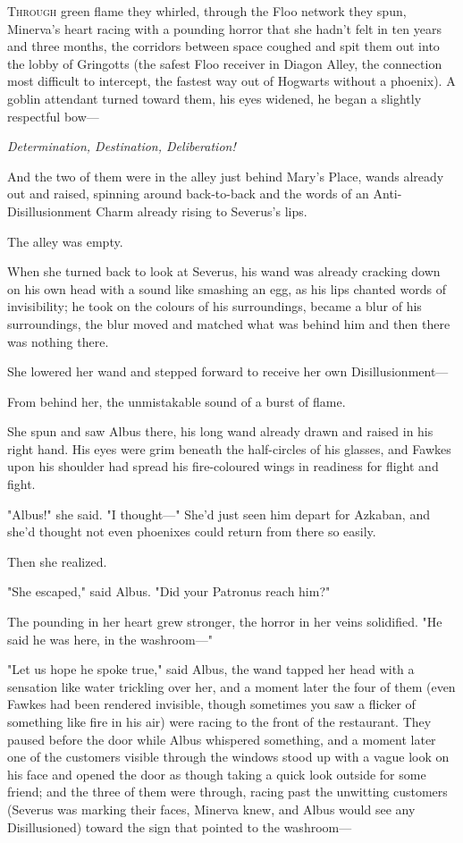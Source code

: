 
\lettrine{T}{hrough} green
flame they whirled, through the Floo network they spun, Minerva's heart racing
with a pounding horror that she hadn't felt in ten years and three months, the
corridors between space coughed and spit them out into the lobby of Gringotts
(the safest Floo receiver in Diagon Alley, the connection most difficult to
intercept, the fastest way out of Hogwarts without a phoenix). A goblin
attendant turned toward them, his eyes widened, he began a slightly respectful
bow---

\emph{Determination, Destination, Deliberation!}

And the two of them were in the alley just behind Mary's Place, wands
already out and raised, spinning around back-to-back and the words of an
Anti-Disillusionment Charm already rising to Severus's lips.

The alley was empty.

When she turned back to look at Severus, his wand was already cracking down on
his own head with a sound like smashing an egg, as his lips chanted words of
invisibility; he took on the colours of his surroundings, became a blur of his
surroundings, the blur moved and matched what was behind him and then there was
nothing there.

She lowered her wand and stepped forward to receive her own Disillusionment---

From behind her, the unmistakable sound of a burst of flame.

She spun and saw Albus there, his long wand already drawn and raised in his
right hand. His eyes were grim beneath the half-circles of his glasses, and
Fawkes upon his shoulder had spread his fire-coloured wings in readiness for
flight and fight.

"Albus!" she said. "I thought---" She'd just seen him depart for Azkaban, and
she'd thought not even phoenixes could return from there so easily.

Then she realized.

"She escaped," said Albus. "Did your Patronus reach him?"

The pounding in her heart grew stronger, the horror in her veins solidified.
"He said he was here, in the washroom---"

"Let us hope he spoke true," said Albus, the wand tapped her head with a
sensation like water trickling over her, and a moment later the four of them
(even Fawkes had been rendered invisible, though sometimes you saw a flicker of
something like fire in his air) were racing to the front of the restaurant.
They paused before the door while Albus whispered something, and a moment later
one of the customers visible through the windows stood up with a vague look on
his face and opened the door as though taking a quick look outside for some
friend; and the three of them were through, racing past the unwitting customers
(Severus was marking their faces, Minerva knew, and Albus would see any
Disillusioned) toward the sign that pointed to the washroom---

